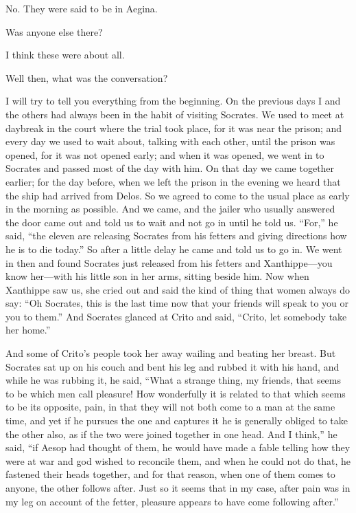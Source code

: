 \documentclass[letterpaper,12pt]{article}
\newcommand{\stephpag}[1]{\marginnote{\small\itshape\fontfamily{ppl}\selectfont #1}}
\begin{document}
\begin{drama}
\phaedospeaks
No. They were said to be in Aegina.
 
\echecratesspeaks
Was anyone else there?
 
\phaedospeaks
I think these were about all.
 
\echecratesspeaks
Well then, what was the conversation?
 
\phaedospeaks
I will try to tell you everything from the beginning. On the previous days \stephpag{d} I and the others had always been in the habit of visiting Socrates. We used to meet at daybreak in the court where the trial took place, for it was near the prison; and every day we used to wait about, talking with each other, until the prison was opened, for it was not opened early; and when it was opened, we went in to Socrates and passed most of the day with him. On that day we came together earlier; for the day before, \stephpag{e} when we left the prison in the evening we heard that the ship had arrived from Delos. So we agreed to come to the usual place as early in the morning as possible. And we came, and the jailer who usually answered the door came out and told us to wait and not go in until he told us. ``For,'' he said, ``the eleven are releasing Socrates from his fetters and giving directions how he is to die today.'' So after a little delay he came and \stephpag{60 a} told us to go in. We went in then and found Socrates just released from his fetters and Xanthippe---you know her---with his little son in her arms, sitting beside him. Now when Xanthippe saw us, she cried out and said the kind of thing that women always do say: ``Oh Socrates, this is the last time now that your friends will speak to you or you to them.'' And Socrates glanced at Crito and said, ``Crito, let somebody take her home.''
 
And some of Crito's people took her away wailing \stephpag{b} and beating her breast. But Socrates sat up on his couch and bent his leg and rubbed it with his hand, and while he was rubbing it, he said, ``What a strange thing, my friends, that seems to be which men call pleasure! How wonderfully it is related to that which seems to be its opposite, pain, in that they will not both come to a man at the same time, and yet if he pursues the one and captures it he is generally obliged to take the other also, as if the two were joined together in one head. And I think,'' \stephpag{c} he said, ``if Aesop had thought of them, he would have made a fable telling how they were at war and god wished to reconcile them, and when he could not do that, he fastened their heads together, and for that reason, when one of them comes to anyone, the other follows after. Just so it seems that in my case, after pain was in my leg on account of the fetter, pleasure appears to have come following after.''
 

\end{drama}
\end{document}
